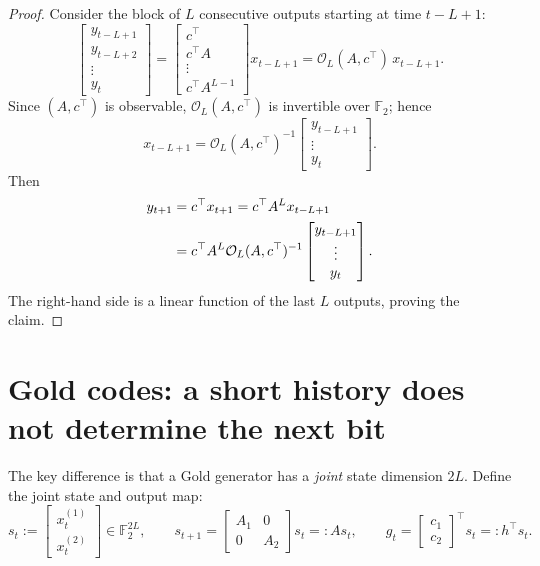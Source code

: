 \documentclass[12pt,a4paper]{report}
\newcommand{\F}{\mathbb{F}}
\theoremstyle{plain}
\begin{document}
\begin{proof}
Consider the block of $L$ consecutive outputs starting at time $t-L+1$:
\begin{equation}
\begin{bmatrix}
y_{t-L+1}\\
y_{t-L+2}\\
\vdots\\
y_{t}
\end{bmatrix}
=
\begin{bmatrix}
c^\top\\
c^\top A\\
\vdots\\
c^\top A^{L-1}
\end{bmatrix}
x_{t-L+1}
= \mathcal{O}_L(A,c^\top)\, x_{t-L+1}. \label{eq:block_obs}
\end{equation}
Since $(A,c^\top)$ is observable, $\mathcal{O}_L(A,c^\top)$ is invertible over $\F_2$; hence
\begin{equation}
x_{t-L+1} = \mathcal{O}_L(A,c^\top)^{-1}
\begin{bmatrix}
y_{t-L+1}\\
\vdots\\
y_t
\end{bmatrix}. \label{eq:state_from_outputs}
\end{equation}
Then
\begin{align}
y_{t+1}
&= c^\top x_{t+1}
= c^\top A^{L} x_{t-L+1} \notag\\
&= c^\top A^{L} \mathcal{O}_L(A,c^\top)^{-1}
\begin{bmatrix}
y_{t-L+1}\\
\vdots\\
y_t
\end{bmatrix}. \label{eq:linear_predictor}
\end{align}
The right-hand side is a linear function of the last $L$ outputs, proving the claim.
\end{proof}

\section{Gold codes: a short history does not determine the next bit}

The key difference is that a Gold generator has a \emph{joint} state dimension $2L$.
Define the joint state and output map:
\begin{equation}
s_t := \begin{bmatrix} x^{(1)}_t\\ x^{(2)}_t\end{bmatrix}\in \F_2^{2L},\qquad
s_{t+1} = \begin{bmatrix} A_1&0\\0&A_2\end{bmatrix} s_t =: A s_t,
\qquad
g_t = \begin{bmatrix} c_1\\c_2\end{bmatrix}^\top s_t =: h^\top s_t.
\end{equation}
\end{document}
